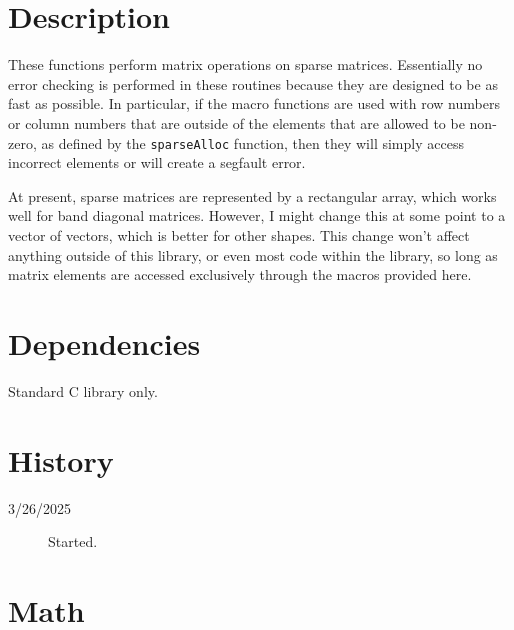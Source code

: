 \documentclass[11pt]{article}
\newcommand {\ttt} {\texttt}
\begin{document}
\section{Description}

These functions perform matrix operations on sparse matrices. Essentially no error checking is performed in these routines because they are designed to be as fast as possible. In particular, if the macro functions are used with row numbers or column numbers that are outside of the elements that are allowed to be non-zero, as defined by the \ttt{sparseAlloc} function, then they will simply access incorrect elements or will create a segfault error.

At present, sparse matrices are represented by a rectangular array, which works well for band diagonal matrices. However, I might change this at some point to a vector of vectors, which is better for other shapes. This change won't affect anything outside of this library, or even most code within the library, so long as matrix elements are accessed exclusively through the macros provided here.

\section{Dependencies}
Standard C library only.

\section{History}
\begin{description}

\item[3/26/2025] Started.

\end{description}


\section{Math}
\end{document}
